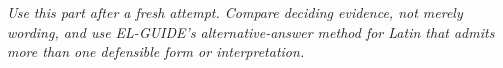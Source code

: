 \noindent\emph{Use this part after a fresh attempt. Compare deciding evidence,
not merely wording, and use EL-GUIDE's alternative-answer method for Latin
that admits more than one defensible form or interpretation.}\par\medskip

